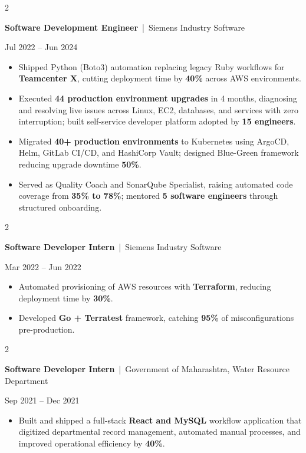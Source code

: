 \documentclass[10pt, letterpaper]{article}
\newenvironment{highlights}{
    \begin{itemize}[
        topsep=0.10 cm,
        parsep=0.06 cm,
        partopsep=0pt,
        itemsep=0.06 cm,
        leftmargin=12pt
    ]
}{
    \end{itemize}
}
\newenvironment{twocolentry}[2][]{
    \onecolentry
    \def\secondColumn{#2}
    \setcolumnwidth{\fill, 4.5 cm}
    \begin{paracol}{2}
}{
    \switchcolumn \raggedleft \secondColumn
    \end{paracol}
    \endonecolentry
}
\begin{document}
\vspace{0.15 cm}

\begin{twocolentry}{Jul 2022 -- Jun 2024}
\textbf{Software Development Engineer} \,|\, Siemens Industry Software
\end{twocolentry}
\begin{highlights}
  \item Shipped Python (Boto3) automation replacing legacy Ruby workflows for \textbf{Teamcenter X}, cutting deployment time by \textbf{40\%} across AWS environments.
  \item Executed \textbf{44 production environment upgrades} in 4 months, diagnosing and resolving live issues across Linux, EC2, databases, and services with zero interruption; built self-service developer platform adopted by \textbf{15 engineers}.
  \item Migrated \textbf{40+ production environments} to Kubernetes using ArgoCD, Helm, GitLab CI/CD, and HashiCorp Vault; designed Blue-Green framework reducing upgrade downtime \textbf{50\%}.
  \item Served as Quality Coach and SonarQube Specialist, raising automated code coverage from \textbf{35\% to 78\%}; mentored \textbf{5 software engineers} through structured onboarding.
\end{highlights}

\vspace{0.15 cm}

\begin{twocolentry}{Mar 2022 -- Jun 2022}
\textbf{Software Developer Intern} \,|\, Siemens Industry Software
\end{twocolentry}
\begin{highlights}
  \item Automated provisioning of AWS resources with \textbf{Terraform}, reducing deployment time by \textbf{30\%}.
  \item Developed \textbf{Go + Terratest} framework, catching \textbf{95\%} of misconfigurations pre-production.
\end{highlights}

\vspace{0.15 cm}

\begin{twocolentry}{Sep 2021 -- Dec 2021}
\textbf{Software Developer Intern} \,|\, Government of Maharashtra, Water Resource Department
\end{twocolentry}
\begin{highlights}
  \item Built and shipped a full-stack \textbf{React and MySQL} workflow application that digitized departmental record management, automated manual processes, and improved operational efficiency by \textbf{40\%}.
\end{highlights}
\end{document}
